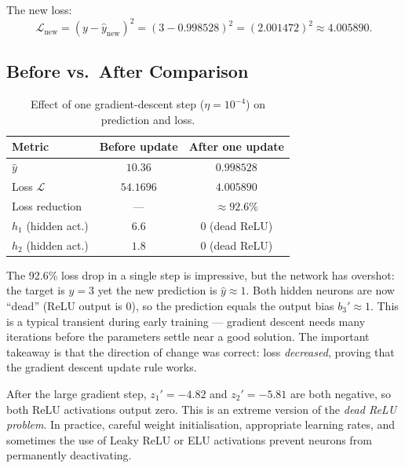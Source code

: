\documentclass[12pt,a4paper]{article}
\newcommand{\Loss}{\mathcal{L}}
\newcommand{\yhat}{\hat{y}}
\begin{document}
The new loss:
\begin{equation}
  \Loss_{\text{new}} = (y - \yhat_{\text{new}})^2
                     = (3 - 0.998528)^2
                     = (2.001472)^2
                     \approx \mathbf{4.005890}.
  \label{eq:loss-new}
\end{equation}

\subsection{Before vs.\ After Comparison}

\begin{table}[ht]
\centering
\caption{Effect of one gradient-descent step ($\eta=10^{-4}$) on prediction
         and loss.}
\label{tab:before-after}
\begin{tabular}{lcc}
\toprule
\textbf{Metric} & \textbf{Before update} & \textbf{After one update} \\
\midrule
$\yhat$             & $10.36$    & $0.998528$ \\
Loss $\Loss$        & $54.1696$  & $4.005890$ \\
Loss reduction      & ---        & $\approx 92.6\%$ \\
$h_1$ (hidden act.) & $6.6$      & $0$ (dead ReLU) \\
$h_2$ (hidden act.) & $1.8$      & $0$ (dead ReLU) \\
\bottomrule
\end{tabular}
\end{table}

\begin{example}
The 92.6\% loss drop in a single step is impressive, but the network has
overshot: the target is $y=3$ yet the new prediction is $\yhat \approx 1$.
Both hidden neurons are now ``dead'' (ReLU output is 0), so the prediction
equals the output bias $b_3' \approx 1$.
This is a typical transient during early training --- gradient descent needs
many iterations before the parameters settle near a good solution.
The important takeaway is that the direction of change was correct: loss
\emph{decreased}, proving that the gradient descent update rule works.
\end{example}

\begin{keyinsight}[title=Dead ReLU Warning]
After the large gradient step, $z_1' = -4.82$ and $z_2' = -5.81$ are both
negative, so both ReLU activations output zero.
This is an extreme version of the \emph{dead ReLU problem}.
In practice, careful weight initialisation, appropriate learning rates, and
sometimes the use of Leaky ReLU or ELU activations prevent neurons from
permanently deactivating.
\end{keyinsight}
\end{document}
